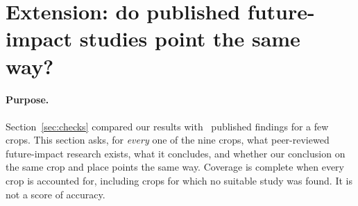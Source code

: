 \section{Extension: do published future-impact studies point the same way?}\label{sec:futurelit}
\paragraph{Purpose.} Section~\ref{sec:checks} compared our results with \litN\ published findings for a few crops. This
section asks, for \emph{every} one of the nine crops, what peer-reviewed future-impact research exists, what it
concludes, and whether our conclusion on the same crop and place points the same way. Coverage is complete when every
crop is accounted for, including crops for which no suitable study was found. It is not a score of accuracy.

